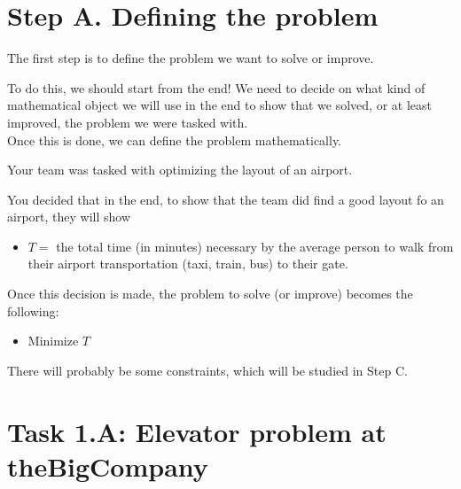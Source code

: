 \section*{Step A. Defining the problem}\label{A-define}

The first step is to define the problem we want to solve or improve.

To do this, we should start from the end! We need to decide on what kind of mathematical object we will use in the end to show that we solved, or at least improved, the problem we were tasked with. \\


Once this is done, we can define the problem mathematically. 

\begin{example}
	Your team was tasked with optimizing the layout of an airport.
	
	You decided that in the end, to show that the team did find a good layout fo an airport, they will show
	\begin{itemize}
		\item $T = $ the total time (in minutes) necessary by the average person to walk from their airport transportation (taxi, train, bus) to their gate.
	\end{itemize}
	
	Once this decision is made, the problem to solve (or improve) becomes the following:
	
	\begin{itemize}
		\item Minimize $T$
	\end{itemize}

	There will probably be some constraints, which will be studied in Step C.

\end{example}


\vfill


\section*{Task 1.A: Elevator problem at theBigCompany}


